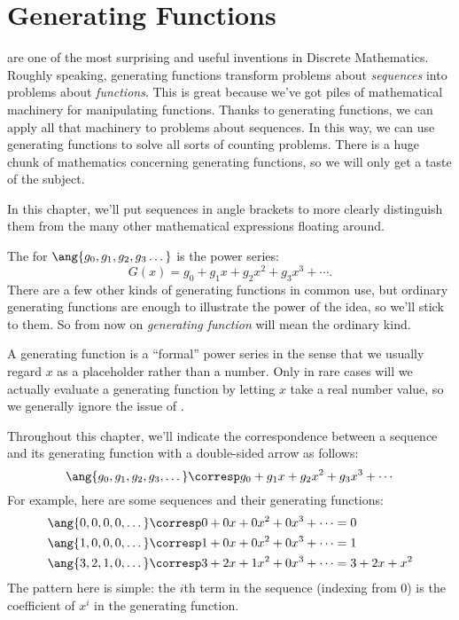 \chapter{Generating Functions}\label{generating_function_chap}

 are one of the most surprising and useful
inventions in Discrete Mathematics.  Roughly speaking, generating
functions transform problems about \textit{sequences} into problems
about \textit{functions}.  This is great because we've got piles of
mathematical machinery for manipulating functions.  Thanks to
generating functions, we can apply all that machinery to problems
about sequences.  In this way, we can use generating functions to
solve all sorts of counting problems.  There is a huge chunk of
mathematics concerning generating functions, so we will only get a
taste of the subject.

In this chapter, we'll put sequences in angle brackets to more clearly
distinguish them from the many other mathematical expressions floating
around.

The  for $\ang{g_0, g_1, g_2, g_3
  \dots}$ is the power series:
\[
G(x) = g_0 + g_1 x + g_2 x^2 + g_3 x^3 + \cdots.
\]
There are a few other kinds of generating functions in common use,
but ordinary generating functions are enough to illustrate the power of
the idea, so we'll stick to them.  So from now on \emph{generating
  function} will mean the ordinary kind.

A generating function is a ``formal'' power series in the sense that we
usually regard $x$ as a placeholder rather than a number.  Only in rare
cases will we actually evaluate a generating function by letting $x$ take
a real number value, so we generally ignore the issue of .

Throughout this chapter, we'll indicate the correspondence between a
sequence and its generating function with a double-sided arrow as
follows:
%
\[
\ang{g_0, g_1, g_2, g_3, \dots}
    \corresp g_0 + g_1 x + g_2 x^2 + g_3 x^3 + \cdots
\]
%
For example, here are some sequences and their generating functions:
%
\begin{align*}
\ang{0, 0, 0, 0, \dots}
    & \corresp 0 + 0 x + 0 x^2 + 0 x^3 + \cdots = 0 \\
\ang{1, 0, 0, 0, \dots}
    & \corresp 1 + 0 x + 0 x^2 + 0 x^3 + \cdots = 1 \\
\ang{3, 2, 1, 0, \dots}
    & \corresp 3 + 2 x + 1 x^2 + 0 x^3 + \cdots = 3 + 2 x + x^2
\end{align*}
%
The pattern here is simple: the $i$th term in the sequence (indexing
from 0) is the coefficient of $x^i$ in the generating function.


